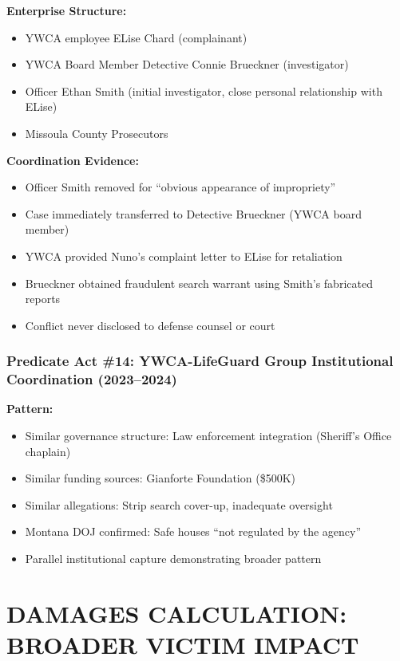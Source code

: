 \documentclass[11pt,letterpaper]{article}
\begin{document}
\textbf{Enterprise Structure:}
\begin{itemize}[leftmargin=*]
\item YWCA employee ELise Chard (complainant)
\item YWCA Board Member Detective Connie Brueckner (investigator)
\item Officer Ethan Smith (initial investigator, close personal relationship with ELise)
\item Missoula County Prosecutors
\end{itemize}

\textbf{Coordination Evidence:}
\begin{itemize}[leftmargin=*]
\item Officer Smith removed for ``obvious appearance of impropriety''
\item Case immediately transferred to Detective Brueckner (YWCA board member)
\item YWCA provided Nuno's complaint letter to ELise for retaliation
\item Brueckner obtained fraudulent search warrant using Smith's fabricated reports
\item Conflict never disclosed to defense counsel or court
\end{itemize}

\subsubsection{Predicate Act \#14: YWCA-LifeGuard Group Institutional Coordination (2023--2024)}

\textbf{Pattern:}
\begin{itemize}[leftmargin=*]
\item Similar governance structure: Law enforcement integration (Sheriff's Office chaplain)
\item Similar funding sources: Gianforte Foundation (\$500K)
\item Similar allegations: Strip search cover-up, inadequate oversight
\item Montana DOJ confirmed: Safe houses ``not regulated by the agency''
\item Parallel institutional capture demonstrating broader pattern
\end{itemize}

\newpage

\section{DAMAGES CALCULATION: BROADER VICTIM IMPACT}
\end{document}
